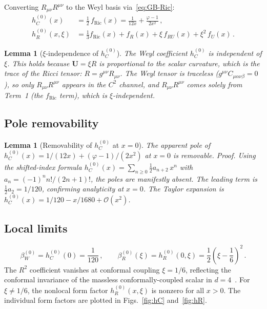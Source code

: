 \documentclass[aps,prd,twocolumn,superscriptaddress,nofootinbib,floatfix]{revtex4-2}
\newtheorem{lemma}[theorem]{Lemma}
\theoremstyle{definition}
\theoremstyle{remark}
\newcommand{\Ricsq}{R_{\mu\nu}R^{\mu\nu}}
\begin{document}
Converting $\Ricsq$ to the Weyl basis via~\eqref{eq:GB-Ric}:
\begin{subequations}
\label{eq:scalar-ff}
\begin{align}
  h_C^{(0)}(x) &= \tfrac{1}{2}\,f_{\text{Ric}}(x)
    = \frac{1}{12x} + \frac{\varphi - 1}{2x^2}\,,
  \label{eq:hC0}\\
  h_R^{(0)}(x,\xi) &= \tfrac{1}{3}f_{\text{Ric}}(x) + f_R(x)
    + \xi\,f_{RU}(x) + \xi^2\,f_U(x)\,.
  \label{eq:hR0}
\end{align}
\end{subequations}

\begin{lemma}[$\xi$-independence of $h_C^{(0)}$]
\label{lem:xi-indep}
The Weyl coefficient $h_C^{(0)}$ is independent of $\xi$. This holds because
$\mathbf{U} = \xi R$ is proportional to the scalar curvature, which is the
trace of the Ricci tensor: $R = g^{\mu\nu}R_{\mu\nu}$. The Weyl tensor is
traceless ($g^{\mu\nu}C_{\mu\alpha\nu\beta} = 0$), so only $\Ricsq$ appears
in the $C^2$ channel, and $\Ricsq$ comes solely from Term~1 (the
$f_{\text{Ric}}$ term), which is $\xi$-independent.
\end{lemma}

\subsection{Pole removability}

\begin{lemma}[Removability of $h_C^{(0)}$ at $x = 0$]
\label{lem:pole-scalar}
The apparent pole of $h_C^{(0)}(x) = 1/(12x) + (\varphi - 1)/(2x^2)$ at
$x = 0$ is removable. \emph{Proof.} Using the shifted-index formula
$h_C^{(0)}(x) = \sum_{n \geq 0}\tfrac{1}{2}a_{n+2}\,x^n$ with
$a_n = (-1)^n n!/(2n+1)!$, the poles are manifestly absent. The leading
term is $\tfrac{1}{2}a_2 = 1/120$, confirming analyticity at $x = 0$.
The Taylor expansion is
$h_C^{(0)}(x) = 1/120 - x/1680 + \mathcal{O}(x^2)$.
\end{lemma}

\subsection{Local limits}

\begin{equation}
  \beta_W^{(0)} = h_C^{(0)}(0) = \frac{1}{120}\,,\qquad
  \beta_R^{(0)}(\xi) = h_R^{(0)}(0,\xi)
    = \frac{1}{2}\!\left(\xi - \frac{1}{6}\right)^{\!2}\,.
  \label{eq:beta-scalar}
\end{equation}
The $R^2$ coefficient vanishes at conformal coupling $\xi = 1/6$, reflecting
the conformal invariance of the massless conformally-coupled scalar in
$d = 4$~\cite{Parker:2009uva}. For $\xi \neq 1/6$, the nonlocal form factor
$h_R^{(0)}(x, \xi)$ is nonzero for all $x > 0$. The individual form factors
are plotted in Figs.~\ref{fig:hC} and~\ref{fig:hR}.
\end{document}
